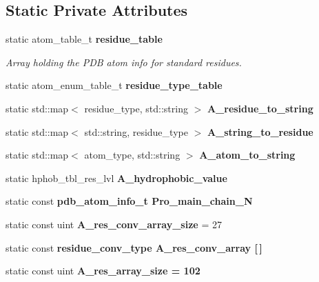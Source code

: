 \subsection*{Static Private Attributes}
\begin{CompactItemize}
\item 
static atom\_\-table\_\-t \bf{residue\_\-table}\label{classSimSite3D_1_1PDB__residues_9a981fa9a9bd789110356942cfc403fe}

\begin{CompactList}\small\item\em Array holding the PDB atom info for standard residues. \item\end{CompactList}\item 
static atom\_\-enum\_\-table\_\-t \textbf{residue\_\-type\_\-table}\label{classSimSite3D_1_1PDB__residues_907ae9bfd49fdee76097eaa56d98b966}

\item 
static std::map$<$ residue\_\-type, std::string $>$ \textbf{A\_\-residue\_\-to\_\-string}\label{classSimSite3D_1_1PDB__residues_510e2d05ca2e160c6a06bdb72bc2609b}

\item 
static std::map$<$ std::string, residue\_\-type $>$ \textbf{A\_\-string\_\-to\_\-residue}\label{classSimSite3D_1_1PDB__residues_f9b818f81d1f59b9fdc4fa1265962f0b}

\item 
static std::map$<$ atom\_\-type, std::string $>$ \textbf{A\_\-atom\_\-to\_\-string}\label{classSimSite3D_1_1PDB__residues_b9ba65f4ec6b2908873dfed2a4894b71}

\item 
static hphob\_\-tbl\_\-res\_\-lvl \textbf{A\_\-hydrophobic\_\-value}\label{classSimSite3D_1_1PDB__residues_46f19f926c02ebd43964b49dcc94e096}

\item 
static const \bf{pdb\_\-atom\_\-info\_\-t} \textbf{Pro\_\-main\_\-chain\_\-N}
\item 
static const uint \textbf{A\_\-res\_\-conv\_\-array\_\-size} = 27\label{classSimSite3D_1_1PDB__residues_0902c72733b48df0d225a27d2f5b9bbb}

\item 
static const \bf{residue\_\-conv\_\-type} \textbf{A\_\-res\_\-conv\_\-array} [$\,$]\label{classSimSite3D_1_1PDB__residues_f83894746507999835fd03709cb7cb09}

\item 
static const uint \bf{A\_\-res\_\-array\_\-size} = 102\label{classSimSite3D_1_1PDB__residues_30b9f32457869af112beb27bee963c4d}


\end{CompactItemize}
